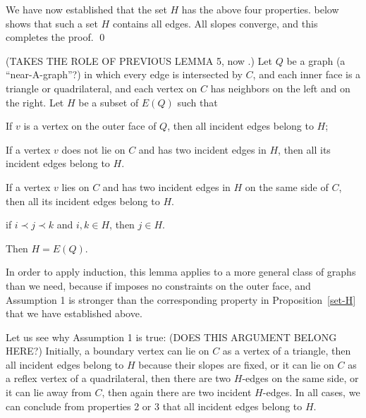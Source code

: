 We have now established that the set $H$ has
 the above four properties.
    below shows that such a set
   $H$ contains all edges. All slopes converge, and this 
   completes the proof.
\qed%


\begin{lem}
(TAKES THE ROLE OF PREVIOUS LEMMA 5, now .)
  Let $Q$ be a graph (a ``near-A-graph''?) in which every edge is intersected
  by $C$, and each inner face is a triangle or quadrilateral, and each
  vertex on $C$ has neighbors on the left and on the right.  Let $H$
  be a subset of $E(Q)$ such that
   \begin{compactenum}
    \item If $v$ is a vertex on the outer face 
      of $Q$, then all incident edges belong to $H$;
    \item
If a vertex $v$ does not lie on $C$ and has two incident edges in
$H$,
then all its incident edges belong to $H$.
    \item
If a vertex $v$ lies on $C$ and has two incident edges in
$H$ on the same side of $C$,
then all its incident edges belong to $H$.
    \item if $i \prec j \prec k$ and $i,k\in H$, 
      then $j\in H$.
   \end{compactenum}
   Then $H=E(Q)$.
\end{lem}

In order to apply induction,
this lemma applies to a more general class of graphs than we
need,
because if imposes no constraints on the outer face,
and
Assumption 1 is stronger than the corresponding property in
Proposition~\ref{set-H} that we have established above.

%
Let us see why Assumption 1 is true: (DOES THIS ARGUMENT BELONG HERE?)
Initially, a boundary vertex
 can
lie on $C$ as a vertex of a triangle, then all incident edges belong to $H$ because their slopes
are fixed,
or it
 can
lie on $C$ as a reflex vertex of a quadrilateral, then there are two
$H$-edges on the same side,
or it can
lie away from $C$, then again there are two
incident $H$-edges.
In all cases, we can conclude from properties 2 or 3 that all incident edges belong to $H$.


